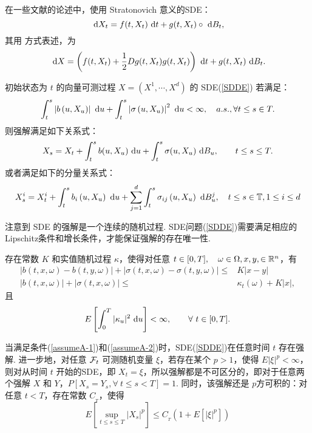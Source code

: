 \begin{remark}
	在一些文献\cite{SG1,SG2,ref_parareal}的论述中，使用 Stratonovich 意义的SDE：
	\[
	\text{ d} X_t = f(t,X_t) \text{ d} t + g(t,X_t) \circ \text{ d} B_t,
	\]
	其用 \ito 方式表述，为
	\[
	\text{ d} X = \left(f(t,X_t) + \frac12 D g(t,X_t) g(t,X_t)\right) \text{ d} t + g(t,X_t) \text{ d} B_t.
	\]
\end{remark}


\begin{definition}[SDE的强解]
	初始状态为 $t$ 的向量可测过程 $X = (X^1,\cdots,X^d)$ 的 SDE(\ref{SDDE}) 若满足：
	\[
	\int_{t}^{s}\left|b\left(u, X_{u}\right)\right| \text{ d} u+\int_{t}^{s}\left|\sigma\left(u, X_{u}\right)\right|^{2} \text{ d} u<\infty, \quad a . s ., \forall t \leq s \in T. 
	\]
	则强解满足如下关系式：
	\[
	X_s = X_t + \int_t^s b(u,X_u) \text{ d} u + \int_t^s \sigma(u,X_u) \text{ d} B_u,\qquad t\le s \le T.
	\]
	或者满足如下的分量关系式：
	\[
	X_{s}^{i}=X_{t}^{i}+\int_{t}^{s} b_{i}\left(u, X_{u}\right) \text{ d} u+\sum_{j=1}^{d} \int_{t}^{s} \sigma_{i j}\left(u, X_{u}\right) \text{ d} B_{u}^{j}, \quad t \leq s \in \mathbb{T}, 1 \leq i \leq d
	\]
\end{definition}
注意到 SDE 的强解是一个连续的随机过程. SDE问题(\ref{SDDE})需要满足相应的 Lipschitz条件和增长条件，才能保证强解的存在唯一性. 

\begin{assump*}[A]
	存在常数 $K$ 和实值随机过程 $\kappa$，使得对任意 $t\in [0,T],\quad \omega \in \Omega, x,y,\in \mathbb{R}^n$，有
	\begin{equation}\label{assumeA-1}
		\begin{aligned}
			|b(t,x,\omega) - b(t,y,\omega)|+|\sigma(t,x,\omega)-\sigma(t,y,\omega)| \le & K|x-y| \\
			|b(t,x,\omega)|+|\sigma(t,x,\omega)| \le & \kappa_t(\omega) + K|x|,
		\end{aligned}
	\end{equation}
	且
	\begin{equation}\label{assumeA-2}
		E \left[ \int_0^T |\kappa_u|^2 \text{ d} u \right] < \infty ,\qquad \forall  ~ t\in [0,T].
	\end{equation}
\end{assump*}

\begin{theorem}[强解的存在唯一性]
	当满足条件(\ref{assumeA-1})和(\ref{assumeA-2})时，SDE(\ref{SDDE})在任意时间 $t$ 存在强解. 进一步地，对任意 $\mathcal{F}_t$ 可测随机变量 $\xi$，若存在某个 $p>1$，使得 $E|\xi|^p < \infty$，则对从时间 $t$ 开始的SDE，即 $X_t=\xi$，所以强解都是不可区分的，即对于任意两个强解 $X$ 和 $Y$，$P[X_s=Y_s,\forall~ t\le s < T]=1$. 同时，该强解还是 $p$方可积的：对任意 $t<T$，存在常数 $C_{_T}$，使得
	\[
	E\left[\sup _{t \leq s \leq T}\left|X_{s}\right|^{p}\right] \leq C_{_T}\left(1+E\left[|\xi|^{p}\right]\right)
	\]
\end{theorem}

